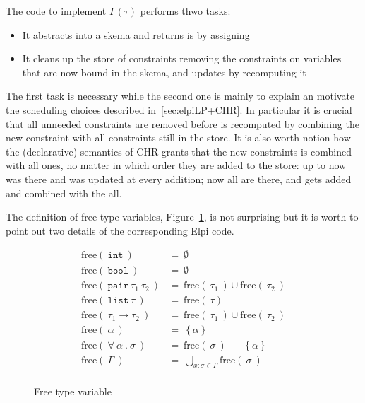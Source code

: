 \documentclass[a4paper, 11pt]{book}
\begin{document}
\noindent
The code to implement $\overline{\Gamma}(\tau)$ performs thwo tasks:

\begin{itemize}
  \item It abstracts  into a skema  and
    returns is by assigning 
  \item It cleans up the store of constraints removing the 
    constraints on variables that are now bound in the skema, and updates
     by recomputing it
\end{itemize}

The first task is necessary while the second one is mainly to explain an motivate
the scheduling choices described in~\ref{sec:elpiLP+CHR}. In particular it is crucial
that all unneeded  constraints are removed before
 is recomputed by combining the new constraint with all
 constraints still in the store. It is also worth notion how
the (declarative) semantics of CHR grants that the new 
constraints is combined with all  ones, no matter in
which order they are added to the store: up to now  was
there and was updated at every  addition; now all
 are there, and  gets added and combined
with the all.

The definition of free type variables, Figure~\ref{img:free}, is not
surprising but it is worth to point out two details of the corresponding Elpi code.

\begin{figure}
$$
\begin{array}{ll}
  \text{free}(\ \mathtt{int}\ ) &=\ \emptyset\\
  \text{free}(\ \mathtt{bool}\ ) &=\ \emptyset\\
  \text{free}(\ \mathtt{pair}\ \tau_1\ \tau_2\ ) &=\ \text{free}(\ \tau_1\ )\cup \text{free}(\ \tau_2\ ) \\
  \text{free}(\ \mathtt{list}\ \tau\ ) &=\ \text{free}(\ \tau ) \\
  \text{free}(\ \tau_1 \to \tau_2\ ) &=\ \text{free}(\ \tau_1\ )\cup \text{free}(\ \tau_2\ ) \\
  \text{free}(\ \alpha\ ) &=\ \left\{\alpha\right\}\\
  \text{free}(\ \forall\ \alpha\ .\ \sigma\ ) &=\ \text{free}(\ \sigma\ )\  -\  \left\{\alpha\right\}\\
  \text{free}(\ \Gamma\ ) &=\ \bigcup\limits_{x:\sigma \in \Gamma}\text{free}(\ \sigma\ )\\
\end{array}
$$
\caption{Free type variable\label{img:free}}
\end{figure}
\end{document}
